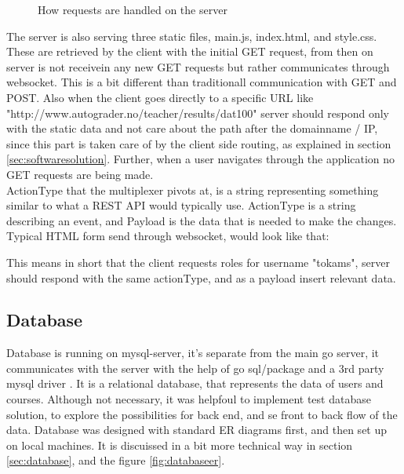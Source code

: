 \begin{figure}[h]
  
  \caption{How requests are handled on the server}
  \label{fig:serverwebsocket}
\end{figure}

The server is also serving three static files, main.js, index.html, and style.css. These are retrieved by the client with the initial GET request, from then on server is not receivein any new GET requests but rather communicates through websocket. This is a bit different than traditionall communication with GET and POST. Also when the client goes directly to a specific URL like "http://www.autograder.no/teacher/results/dat100" server should respond only with the static data and not care about the path after the domainname / IP, since this part is taken care of by the client side routing, as explained in section \ref{sec:softwaresolution}. Further, when a user navigates through the application no GET requests are being made.
\\ActionType that the multiplexer pivots at, is a string representing something similar to what a REST API would typically use. ActionType is a string describing an event, and Payload is the data that is needed to make the changes. Typical HTML form send through websocket, would look like that:


This means in short that the client requests roles for username "tokams", server should respond with the same actionType, and as a payload insert relevant data.

\subsection {Database}
Database is running on mysql-server, it's separate from the main go server, it communicates with the server with the help of go sql/package and a 3rd party mysql driver \cite{ziutek}. It is a relational database, that represents the data of users and courses. Although not necessary, it was helpfoul to implement test database solution, to explore the possibilities for back end, and se front to back flow of the data. Database was designed with standard ER diagrams first, and then set up on local machines.
It is discuissed in a bit more technical way in section \ref{sec:database}, and the figure \ref{fig:databaseer}.

